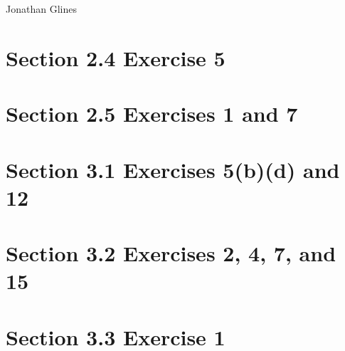 \documentclass[12pt]{article}
\begin{document}
\begin{flushright}
\Large{Jonathan Glines}
\end{flushright}
\section*{Section 2.4 Exercise 5}
\section*{Section 2.5 Exercises 1 and 7}
\section*{Section 3.1 Exercises 5(b)(d) and 12}
\section*{Section 3.2 Exercises 2, 4, 7, and 15}
\section*{Section 3.3 Exercise 1}
\end{document}
